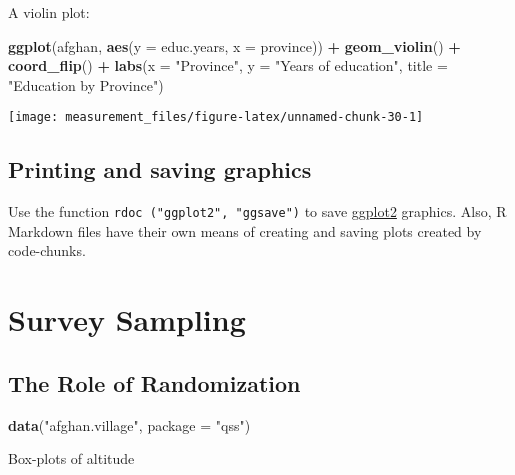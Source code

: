 \documentclass[]{book}
\newenvironment{Shaded}{\begin{snugshade}}{\end{snugshade}}
\newcommand{\KeywordTok}[1]{\textcolor[rgb]{0.13,0.29,0.53}{\textbf{#1}}}
\newcommand{\DataTypeTok}[1]{\textcolor[rgb]{0.13,0.29,0.53}{#1}}
\newcommand{\StringTok}[1]{\textcolor[rgb]{0.31,0.60,0.02}{#1}}
\newcommand{\OperatorTok}[1]{\textcolor[rgb]{0.81,0.36,0.00}{\textbf{#1}}}
\newcommand{\NormalTok}[1]{#1}
\theoremstyle{definition}
\theoremstyle{definition}
\theoremstyle{definition}
\theoremstyle{remark}
\begin{document}
A violin plot:

\begin{Shaded}
\begin{Highlighting}[]
\KeywordTok{ggplot}\NormalTok{(afghan, }\KeywordTok{aes}\NormalTok{(}\DataTypeTok{y =}\NormalTok{ educ.years, }\DataTypeTok{x =}\NormalTok{ province)) }\OperatorTok{+}
\StringTok{  }\KeywordTok{geom_violin}\NormalTok{() }\OperatorTok{+}
\StringTok{  }\KeywordTok{coord_flip}\NormalTok{() }\OperatorTok{+}
\StringTok{  }\KeywordTok{labs}\NormalTok{(}\DataTypeTok{x =} \StringTok{"Province"}\NormalTok{, }\DataTypeTok{y =} \StringTok{"Years of education"}\NormalTok{,}
       \DataTypeTok{title =} \StringTok{"Education by Province"}\NormalTok{)}
\end{Highlighting}
\end{Shaded}

\begin{center}\texttt{[image: measurement\_files/figure-latex/unnamed-chunk-30-1]} \end{center}

\subsection{Printing and saving
graphics}\label{printing-and-saving-graphics}

Use the function \texttt{rdoc\ ("ggplot2",\ "ggsave")} to save
\href{https://cran.r-project.org/package=ggplot2}{ggplot2} graphics.
Also, R Markdown files have their own means of creating and saving plots
created by code-chunks.

\section{Survey Sampling}\label{survey-sampling}

\subsection{The Role of Randomization}\label{the-role-of-randomization}

\begin{Shaded}
\begin{Highlighting}[]
\KeywordTok{data}\NormalTok{(}\StringTok{"afghan.village"}\NormalTok{, }\DataTypeTok{package =} \StringTok{"qss"}\NormalTok{)}
\end{Highlighting}
\end{Shaded}

Box-plots of altitude
\end{document}

